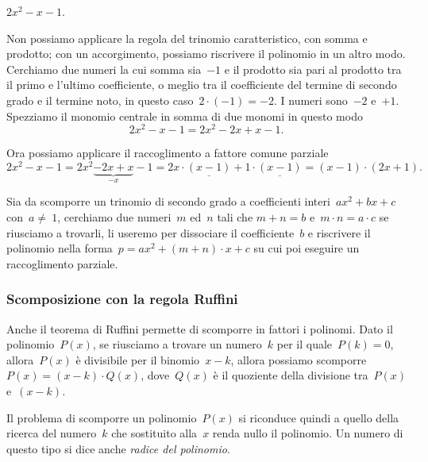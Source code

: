 \begin{exrig}
 \begin{esempio}
 $2x^{2}-x-1$.

Non possiamo applicare la regola del trinomio caratteristico, con somma
e prodotto; con un accorgimento, possiamo riscrivere il polinomio in un
altro modo. Cerchiamo due numeri la cui somma sia~$-1$ e il prodotto sia
pari al prodotto tra il primo e l'ultimo coefficiente,
o meglio tra il coefficiente del termine di secondo grado e il termine
noto, in questo caso~$2\cdot (-1)=-2$. I numeri sono~$-2$ e~$+1$.
Spezziamo il monomio centrale in somma di due monomi in questo modo
\[2x^{2}-x-1=2x^{2}-2x+x-1.\]

Ora possiamo applicare il raccoglimento a fattore comune parziale
\[2x^{2}-x-1=2x^{2}\underbrace{-2x+x}_{-x}-1=2x\cdot
\underline{{(x-1)}}+1\cdot
\underline{{(x-1)}}=\left(x-1\right)\cdot \left(2x+1\right).\]
 \end{esempio}
\end{exrig}

\begin{procedura}
Sia da scomporre un trinomio di secondo grado a coefficienti interi~$ax^{2}+bx+c$
con~$a\neq~1$, cerchiamo due numeri~$m$ ed~$n$ tali che  $m+n=b$ e~$m\cdot n=a\cdot c$
se riusciamo a trovarli, li useremo per dissociare
il coefficiente~$b$ e riscrivere il polinomio nella forma~$p=ax^{2}+\left(m+n\right)\cdot x+c$
su cui poi eseguire un raccoglimento parziale.
\end{procedura}


\subsubsection{Scomposizione con la regola Ruffini}
\label{subsubsec:divpol_scompruff}

Anche il teorema di Ruffini permette di scomporre in fattori i polinomi.
Dato il polinomio~$P(x)$, se riusciamo a trovare un numero~$k$
per il quale~$P(k)=0$, allora~$P(x)$ è divisibile per il binomio~$x-k$, 
allora possiamo scomporre~$P(x)=(x-k)\cdot Q(x)$, dove~$Q(x)$
è il quoziente della divisione tra~$P(x)$ e~$(x-k)$.

Il problema di scomporre un polinomio~$P(x)$ si riconduce quindi a quello
della ricerca del numero~$k$ che sostituito alla~$x$ renda nullo il
polinomio. Un numero di questo tipo si dice anche \emph{radice del polinomio}.

